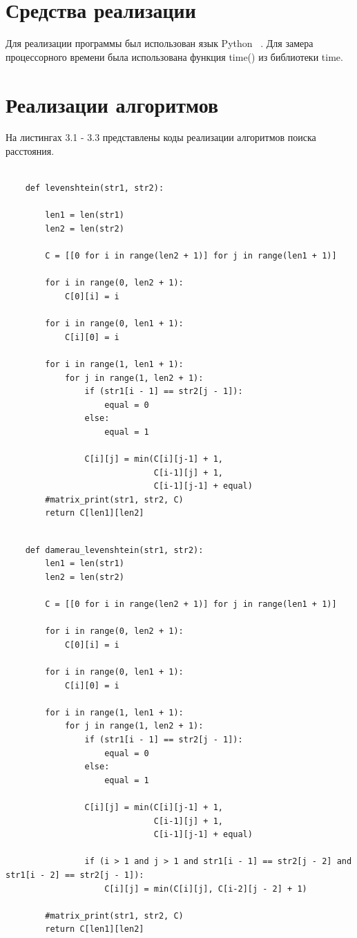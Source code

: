 \documentclass[12pt, a4paper]{report}
\begin{document}
	\section{Средства реализации}
	Для реализации программы был использован язык Python ~\cite{CPP}. Для замера процессорного времени была использована функция time() из библиотеки time.
	\section{Реализации алгоритмов}
	На листингах 3.1 - 3.3 представлены коды реализации алгоритмов поиска расстояния.
	\begin{lstlisting}[label=some-code,caption=Матричная реализация алгоритма Левенштейна]
		
	def levenshtein(str1, str2):
	
		len1 = len(str1)
		len2 = len(str2)
	
		C = [[0 for i in range(len2 + 1)] for j in range(len1 + 1)]
	
		for i in range(0, len2 + 1):
			C[0][i] = i
	
		for i in range(0, len1 + 1):
			C[i][0] = i
	
		for i in range(1, len1 + 1):
			for j in range(1, len2 + 1):
				if (str1[i - 1] == str2[j - 1]):
					equal = 0
				else:
					equal = 1
	
				C[i][j] = min(C[i][j-1] + 1,
							  C[i-1][j] + 1,
							  C[i-1][j-1] + equal)
		#matrix_print(str1, str2, C)
		return C[len1][len2]
	\end{lstlisting}

	\begin{lstlisting}[label=some-code,caption=Матричная реализация алгоритма Дамерау-Левенштейна]
	
	def damerau_levenshtein(str1, str2):
		len1 = len(str1)
		len2 = len(str2)
		
		C = [[0 for i in range(len2 + 1)] for j in range(len1 + 1)]
		
		for i in range(0, len2 + 1):
			C[0][i] = i
		
		for i in range(0, len1 + 1):
			C[i][0] = i
		
		for i in range(1, len1 + 1):
			for j in range(1, len2 + 1):
				if (str1[i - 1] == str2[j - 1]):
					equal = 0
				else:
					equal = 1
		
				C[i][j] = min(C[i][j-1] + 1,
							  C[i-1][j] + 1,
							  C[i-1][j-1] + equal)
		
				if (i > 1 and j > 1 and str1[i - 1] == str2[j - 2] and str1[i - 2] == str2[j - 1]):
					C[i][j] = min(C[i][j], C[i-2][j - 2] + 1)
		
		#matrix_print(str1, str2, C)
		return C[len1][len2]
	
	\end{lstlisting}
\end{document}
